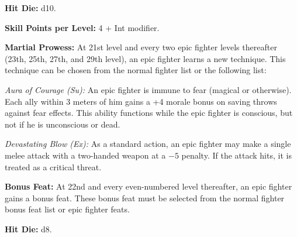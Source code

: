 
\textbf{Hit Die:} d10.

\textbf{Skill Points per Level:} 4 + Int modifier.

\textbf{Martial Prowess:} At 21st level and every two epic fighter levels thereafter (23th, 25th, 27th, and 29th level), an epic fighter learns a new technique. This technique can be chosen from the normal fighter list or the following list:

\textit{Aura of Courage (Su):} An epic fighter is immune to fear (magical or otherwise). Each ally within 3 meters of him gains a +4 morale bonus on saving throws against fear effects. This ability functions while the epic fighter is conscious, but not if he is unconscious or dead.

\textit{Devastating Blow (Ex):} As a standard action, an epic fighter may make a single melee attack with a two-handed weapon at a $-5$ penalty. If the attack hits, it is treated as a critical threat.


\textbf{Bonus Feat:} At 22nd and every even-numbered level thereafter, an epic fighter gains a bonus feat. These bonus feat must be selected from the normal fighter bonus feat list or epic fighter feats.





\textbf{Hit Die:} d8.

